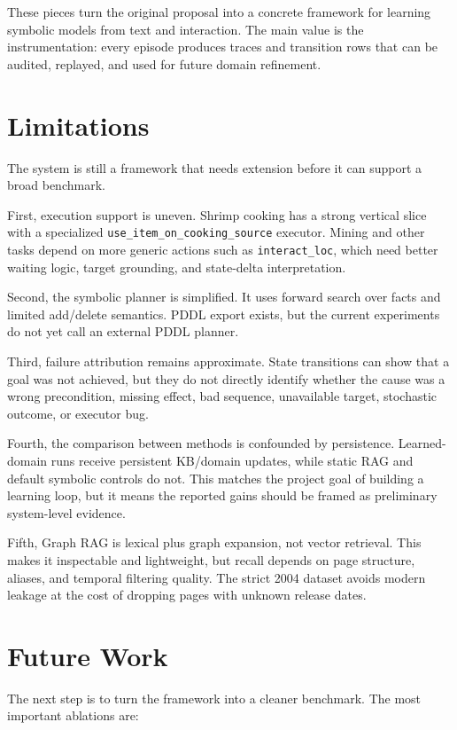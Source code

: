\documentclass[10pt,twocolumn,letterpaper]{article}
\begin{document}
These pieces turn the original proposal into a concrete framework for learning symbolic models from text and interaction. The main value is the instrumentation: every episode produces traces and transition rows that can be audited, replayed, and used for future domain refinement.

\section{Limitations}

The system is still a framework that needs extension before it can support a broad benchmark.

First, execution support is uneven. Shrimp cooking has a strong vertical slice with a specialized \texttt{use\_item\_on\_cooking\_source} executor. Mining and other tasks depend on more generic actions such as \texttt{interact\_loc}, which need better waiting logic, target grounding, and state-delta interpretation.

Second, the symbolic planner is simplified. It uses forward search over facts and limited add/delete semantics. PDDL export exists, but the current experiments do not yet call an external PDDL planner.

Third, failure attribution remains approximate. State transitions can show that a goal was not achieved, but they do not directly identify whether the cause was a wrong precondition, missing effect, bad sequence, unavailable target, stochastic outcome, or executor bug.

Fourth, the comparison between methods is confounded by persistence. Learned-domain runs receive persistent KB/domain updates, while static RAG and default symbolic controls do not. This matches the project goal of building a learning loop, but it means the reported gains should be framed as preliminary system-level evidence.

Fifth, Graph RAG is lexical plus graph expansion, not vector retrieval. This makes it inspectable and lightweight, but recall depends on page structure, aliases, and temporal filtering quality. The strict 2004 dataset avoids modern leakage at the cost of dropping pages with unknown release dates.

\section{Future Work}

The next step is to turn the framework into a cleaner benchmark. The most important ablations are:
\end{document}
